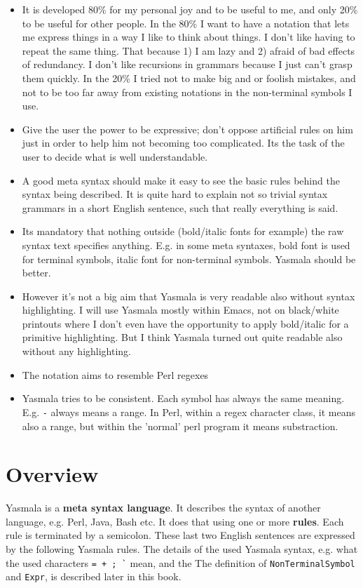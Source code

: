 \documentclass[a4paper]{report}
\begin{document}
\begin{itemize}
\item It is developed 80\% for my personal joy and to be useful to me, and only 20\%
  to be useful for other people. In the 80\% I want to have a notation that
  lets me express things in a way I like to think about things. I don't like
  having to repeat the same thing. That because 1) I am lazy and 2) afraid of
  bad effects of redundancy. I don't like recursions in grammars because I just
  can't grasp them quickly. In the 20\% I tried not to make big and or foolish
  mistakes, and not to be too far away from existing notations in the
  non-terminal symbols I use.
\item Give the user the power to be expressive; don't oppose artificial rules on
  him just in order to help him not becoming too complicated. Its the task of
  the user to decide what is well understandable.
\item A good meta syntax should make it easy to see the basic rules
  behind the syntax being described. It is quite hard to explain not so trivial
  syntax grammars in a short English sentence, such that really everything is
  said.
\item Its mandatory that nothing outside (bold/italic fonts for
  example) the raw syntax text specifies anything. E.g. in some meta syntaxes,
  bold font is used for terminal symbols, italic font for non-terminal symbols.
  Yasmala should be better.
\item However it's not a big aim that Yasmala is very readable also without
  syntax highlighting. I will use Yasmala mostly within Emacs, not on
  black/white printouts where I don't even have the opportunity to apply
  bold/italic for a primitive highlighting. But I think Yasmala turned out
  quite readable also without any highlighting.
\item The notation aims to resemble Perl regexes
\item Yasmala tries to be consistent. Each symbol has always the same meaning.
  E.g. \verb|-| always means a range. In Perl, within a regex character class,
  it means also a range, but within the 'normal' perl program it means
  substraction.
\end{itemize}

  
\section{Overview} %

Yasmala is a \textbf{meta syntax language}. It describes the syntax of another
language, e.g. Perl, Java, Bash etc. It does that using one or more
\textbf{rules}. Each rule is terminated by a semicolon. These last two English
sentences are expressed by the following Yasmala rules. The details of the used
Yasmala syntax, e.g. what the used characters \verb|= + ; `| mean, and the The
definition of \verb|NonTerminalSymbol| and \verb|Expr|, is described later in
this book.
\end{document}
